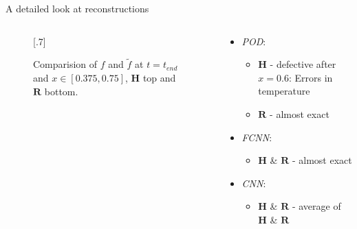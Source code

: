 \documentclass[usenames,dvipsnames,Nike,mathserif]{tuberlinbeamer}
\begin{document}
\begin{frame}[fragile]{A detailed look at reconstructions}
	\begin{columns}
		\begin{column}{.61\textwidth}
			\begin{figure}
				\vspace{-.5cm}
				\scalebox{.7}[.7]{}
				\caption{
					Comparision of $f$ and $\tilde{f}$ at $t=t_{end}$ and $x\in[0.375,0.75]$, $\mathbf{H}$ top and $\mathbf{R}$ bottom.}
			\end{figure}
		\end{column}
		\begin{column}{.39\textwidth}
			\begin{itemize}
				\item<2->\emph{POD}:
				\begin{itemize}
					\item $\mathbf{H}$ - defective after $x=0.6$: Errors in temperature
					\item $\mathbf{R}$ - almost exact
				\end{itemize}
				\item<3->\emph{FCNN}:
				\begin{itemize}
					\item $\mathbf{H}$ \& $\mathbf{R}$ - almost exact 
				\end{itemize}
				\item<4->\emph{CNN}:
				\begin{itemize}
					\item $\mathbf{H}$ \& $\mathbf{R}$ - average of $\mathbf{H}$ \& $\mathbf{R}$
				\end{itemize}
			\end{itemize}
		\end{column}
	\end{columns}
\end{frame}
\end{document}
